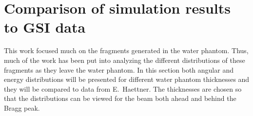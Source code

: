 \clearpage
\section{Comparison of simulation results to GSI data}

This work focused much on the fragments generated in the water phantom. Thus, much of the work has been put into analyzing the different distributions of these fragments as they leave the water phantom. In this section both angular and energy distributions will be presented for different water phantom thicknesses and they will be compared to data from E.~Haettner. The thicknesses are chosen so that the distributions can be viewed for the beam both ahead and behind the Bragg peak.

